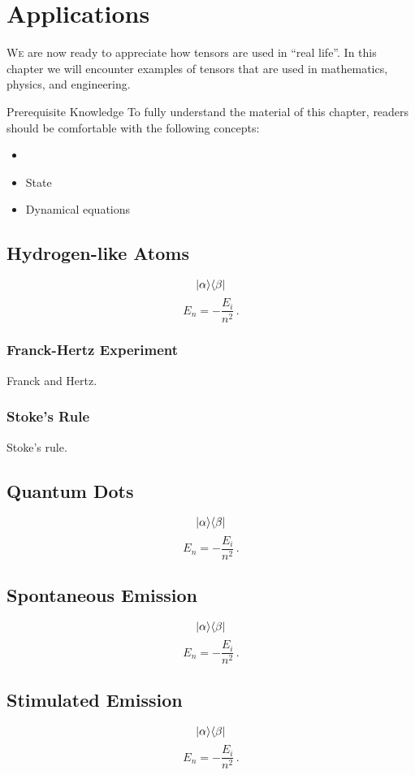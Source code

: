 \chapter{Applications}\label{ch:Applications}
\lettrine[lines=2]{\color{darkocre}W}{e} are now ready to appreciate
how tensors are used in ``real life''. In this chapter we will
encounter examples of
tensors that are used in mathematics, physics, and engineering. 

\begin{myprereq}{Prerequisite Knowledge}
	To fully understand the material of this chapter, readers should be comfortable with the following concepts:
	
	\begin{itemize}
		\item \phantom{phantom}
		\vspace{-0.5cm}
		\item State
		\item Dynamical equations
	\end{itemize}	
\end{myprereq}

\section{Hydrogen-like Atoms}
\[
|{\alpha}\rangle\langle{\beta}|
\]
\[
E_n = -\frac{E_i}{n^2}\,.
\]

\subsection{Franck-Hertz Experiment}
Franck and Hertz.

\subsection{Stoke's Rule}
Stoke's rule.

\section{Quantum Dots}
\[
|{\alpha}\rangle\langle{\beta}|
\]
\[
E_n = -\frac{E_i}{n^2}\,.
\]

\section{Spontaneous Emission}
\[
|{\alpha}\rangle\langle{\beta}|
\]
\[
E_n = -\frac{E_i}{n^2}\,.
\]

\section{Stimulated Emission}
\[
|{\alpha}\rangle\langle{\beta}|
\]
\[
E_n = -\frac{E_i}{n^2}\,.
\]

